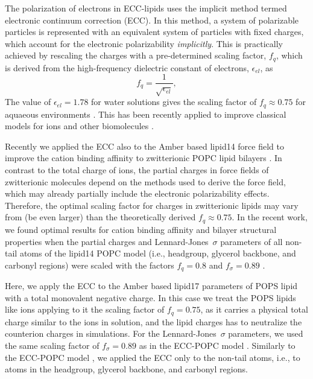 \documentclass[journal=jpcbfk,manuscript=article]{achemso}
\begin{document}
The polarization of electrons in ECC-lipids uses the implicit method termed electronic continuum correction (ECC). \cite{leontyev09, Pluharova2014, martinek17, melcr18} 
In this method, a system of polarizable particles is represented 
with an equivalent system of particles with fixed charges,
which account for the electronic polarizability \emph{implicitly}. 
This is practically achieved by rescaling the charges with a pre-determined scaling factor, $f_q$,
which is derived from the high-frequency dielectric constant of electrons, $\epsilon_{el}$, as
\begin{equation}
  f_q = \frac{1}{\sqrt{\epsilon_{el}}} ,
\end{equation}
The value of $\epsilon_{el} = 1.78$ for water solutions gives the scaling
factor of $f_q \approx 0.75$ for aquaeous environments \cite{leontyev09}.
This has been recently applied to improve classical models for ions and
other biomolecules \cite{Pluharova2014, martinek17, melcr18}
.

Recently we applied the ECC also to the Amber based lipid14 force field \cite{dickson14} to
improve the cation binding affinity to zwitterionic POPC lipid bilayers \cite{melcr18}.
In contrast to the total charge of ions, 
the partial charges in force fields of zwitterionic molecules
depend on the methods used to derive the force field, 
which may already partially include the
electronic polarizability effects. Therefore, the optimal scaling factor for charges in
zwitterionic lipids may vary from (be even larger) than the theoretically derived $f_q \approx 0.75$.
In the recent work, we found optimal results for cation binding affinity and
bilayer structural properties when the partial charges and Lennard-Jones~$\sigma$
parameters of all non-tail atoms of the lipid14 POPC model
(i.e., headgroup, glycerol backbone, and carbonyl regions) 
were scaled with the factors $f_q = 0.8$ and $f_\sigma = 0.89$  \cite{melcr18}.


Here, we apply the ECC to the Amber based lipid17 parameters \cite{lipid17-future} of POPS lipid with
a total monovalent negative charge. 
In this case we treat the POPS lipids like ions
applying to it the scaling factor of $f_q = 0.75$,
as it carries a physical total charge similar to the ions in solution, 
and the lipid charges has to neutralize the counterion charges in simulations.
For the Lennard-Jones~$\sigma$ parameters, we used the same scaling factor of $f_\sigma = 0.89$
as in the ECC-POPC model \cite{melcr18}.
Similarly to the ECC-POPC model \cite{melcr18}, we applied the ECC only to the
non-tail atoms, i.e., to atoms in the headgroup, glycerol backbone, and carbonyl regions. 
\end{document}
